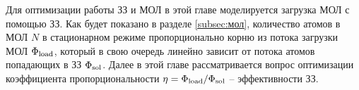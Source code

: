 Для оптимизации работы ЗЗ и МОЛ в этой главе моделируется загрузка МОЛ с помощью ЗЗ. Как будет показано в разделе \ref{subsec:мол}, количество атомов в МОЛ $N$ в стационарном режиме пропорционально корню из потока загрузки МОЛ $\Phi_{\textnormal{load}}$, который в свою очередь линейно зависит от потока атомов попадающих в ЗЗ $\Phi_{\textnormal{sol}}$. Далее в этой главе рассматривается вопрос оптимизации коэффициента пропорциональности $\eta = \Phi_{\textnormal{load}} / \Phi_{\textnormal{sol}}$ -- эффективности ЗЗ. 
